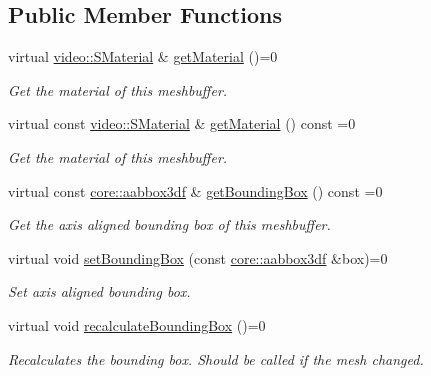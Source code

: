 \subsection*{Public Member Functions}
\begin{DoxyCompactItemize}
\item 
virtual \hyperlink{classirr_1_1video_1_1SMaterial}{video\+::\+S\+Material} \& \hyperlink{classirr_1_1scene_1_1IDynamicMeshBuffer_a6ed3a5ce948ebef063b7ea9e07974eb7}{get\+Material} ()=0
\begin{DoxyCompactList}\small\item\em Get the material of this meshbuffer. \end{DoxyCompactList}\item 
virtual const \hyperlink{classirr_1_1video_1_1SMaterial}{video\+::\+S\+Material} \& \hyperlink{classirr_1_1scene_1_1IDynamicMeshBuffer_a3be83e4819e9f79a3d9b264eb8bf4cfc}{get\+Material} () const =0
\begin{DoxyCompactList}\small\item\em Get the material of this meshbuffer. \end{DoxyCompactList}\item 
virtual const \hyperlink{namespaceirr_1_1core_adfc8fa01b30044c55f3332a1d6c1aa19}{core\+::aabbox3df} \& \hyperlink{classirr_1_1scene_1_1IDynamicMeshBuffer_a9053baee5a13c8b51e306d99e5ef7427}{get\+Bounding\+Box} () const =0
\begin{DoxyCompactList}\small\item\em Get the axis aligned bounding box of this meshbuffer. \end{DoxyCompactList}\item 
virtual void \hyperlink{classirr_1_1scene_1_1IDynamicMeshBuffer_adbe127e3774de6ae7ce96cb534a336e5}{set\+Bounding\+Box} (const \hyperlink{namespaceirr_1_1core_adfc8fa01b30044c55f3332a1d6c1aa19}{core\+::aabbox3df} \&box)=0
\begin{DoxyCompactList}\small\item\em Set axis aligned bounding box. \end{DoxyCompactList}\item 
\mbox{\label{classirr_1_1scene_1_1IDynamicMeshBuffer_a0b3351f29578e0340c2e2ce3d03c9e59}} 
virtual void \hyperlink{classirr_1_1scene_1_1IDynamicMeshBuffer_a0b3351f29578e0340c2e2ce3d03c9e59}{recalculate\+Bounding\+Box} ()=0
\begin{DoxyCompactList}\small\item\em Recalculates the bounding box. Should be called if the mesh changed. \end{DoxyCompactList}\item 

\end{DoxyCompactItemize}
